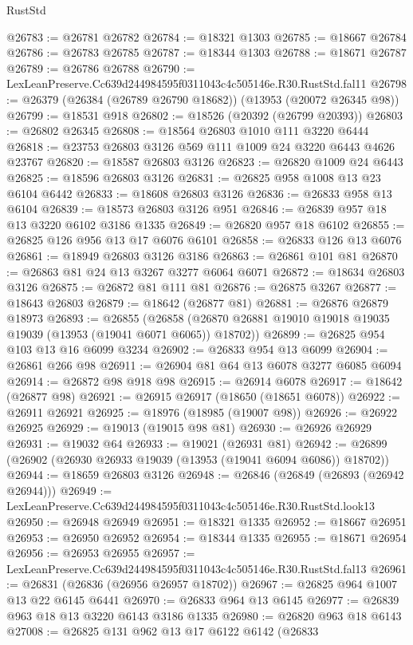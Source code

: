 \begin{lexlean}{RustStd}
\begin{coremodule}
@26783 := @26781 @26782
@26784 := @18321 @1303
@26785 := @18667 @26784
@26786 := @26783 @26785
@26787 := @18344 @1303
@26788 := @18671 @26787
@26789 := @26786 @26788
@26790 := LexLeanPreserve.Cc639d244984595f0311043c4c505146e.R30.RustStd.fal11
@26798 := @26379 (@26384 (@26789 @26790 @18682)) (@13953 (@20072 @26345 @98))
@26799 := @18531 @918
@26802 := @18526 (@20392 (@26799 @20393))
@26803 := @26802 @26345
@26808 := @18564 @26803 @1010 @111 @3220 @6444
@26818 := @23753 @26803 @3126 @569 @111 @1009 @24 @3220 @6443 @4626 @23767
@26820 := @18587 @26803 @3126
@26823 := @26820 @1009 @24 @6443
@26825 := @18596 @26803 @3126
@26831 := @26825 @958 @1008 @13 @23 @6104 @6442
@26833 := @18608 @26803 @3126
@26836 := @26833 @958 @13 @6104
@26839 := @18573 @26803 @3126 @951
@26846 := @26839 @957 @18 @13 @3220 @6102 @3186 @1335
@26849 := @26820 @957 @18 @6102
@26855 := @26825 @126 @956 @13 @17 @6076 @6101
@26858 := @26833 @126 @13 @6076
@26861 := @18949 @26803 @3126 @3186
@26863 := @26861 @101 @81
@26870 := @26863 @81 @24 @13 @3267 @3277 @6064 @6071
@26872 := @18634 @26803 @3126
@26875 := @26872 @81 @111 @81
@26876 := @26875 @3267
@26877 := @18643 @26803
@26879 := @18642 (@26877 @81)
@26881 := @26876 @26879 @18973
@26893 := @26855
    (@26858 (@26870 @26881 @19010 @19018 @19035 @19039 (@13953 (@19041 @6071 @6065)) @18702))
@26899 := @26825 @954 @103 @13 @16 @6099 @3234
@26902 := @26833 @954 @13 @6099
@26904 := @26861 @266 @98
@26911 := @26904 @81 @64 @13 @6078 @3277 @6085 @6094
@26914 := @26872 @98 @918 @98
@26915 := @26914 @6078
@26917 := @18642 (@26877 @98)
@26921 := @26915 @26917 (@18650 (@18651 @6078))
@26922 := @26911 @26921
@26925 := @18976 (@18985 (@19007 @98))
@26926 := @26922 @26925
@26929 := @19013 (@19015 @98 @81)
@26930 := @26926 @26929
@26931 := @19032 @64
@26933 := @19021 (@26931 @81)
@26942 := @26899 (@26902 (@26930 @26933 @19039 (@13953 (@19041 @6094 @6086)) @18702))
@26944 := @18659 @26803 @3126
@26948 := @26846 (@26849 (@26893 (@26942 @26944)))
@26949 := LexLeanPreserve.Cc639d244984595f0311043c4c505146e.R30.RustStd.look13
@26950 := @26948 @26949
@26951 := @18321 @1335
@26952 := @18667 @26951
@26953 := @26950 @26952
@26954 := @18344 @1335
@26955 := @18671 @26954
@26956 := @26953 @26955
@26957 := LexLeanPreserve.Cc639d244984595f0311043c4c505146e.R30.RustStd.fal13
@26961 := @26831 (@26836 (@26956 @26957 @18702))
@26967 := @26825 @964 @1007 @13 @22 @6145 @6441
@26970 := @26833 @964 @13 @6145
@26977 := @26839 @963 @18 @13 @3220 @6143 @3186 @1335
@26980 := @26820 @963 @18 @6143
@27008 := @26825
    @131
    @962
    @13
    @17
    @6122
    @6142
    (@26833

\end{coremodule}
\end{lexlean}
